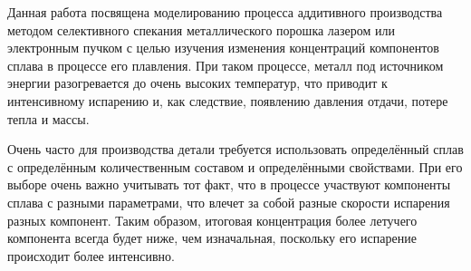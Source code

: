 Данная работа посвящена моделированию процесса аддитивного производства методом селективного спекания металлического порошка лазером или электронным пучком с целью изучения изменения концентраций компонентов сплава в процессе его плавления. При таком процессе, металл под источником энергии разогревается до очень высоких температур, что приводит к интенсивному испарению и, как следствие, появлению давления отдачи, потере тепла и массы. 

Очень часто для производства детали требуется использовать определённый сплав с определённым количественным составом и определёнными свойствами. При его выборе очень важно учитывать тот факт, что в процессе участвуют компоненты сплава с разными параметрами, что влечет за собой разные скорости испарения разных компонент. Таким образом, итоговая концентрация более летучего компонента всегда будет ниже, чем изначальная, поскольку его испарение происходит более интенсивно.

\clearpage